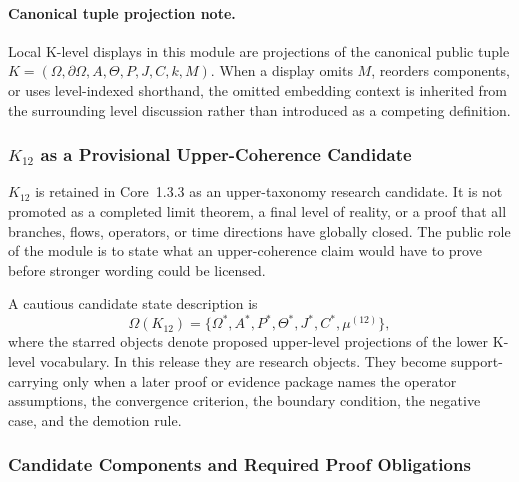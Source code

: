 
\paragraph{Canonical tuple projection note.}
Local K-level displays in this module are projections of the canonical public
tuple \(K=(\Omega,\partial\Omega,A,\Theta,P,J,C,k,M)\). When a display omits
\(M\), reorders components, or uses level-indexed shorthand, the omitted
embedding context is inherited from the surrounding level discussion rather
than introduced as a competing definition.

\subsubsection{\texorpdfstring{$K_{12}$}{K12} as a Provisional Upper-Coherence Candidate}
\label{sec:k12-overview}

\(K_{12}\) is retained in Core~1.3.3 as an upper-taxonomy research candidate.
It is not promoted as a completed limit theorem, a final level of reality, or a
proof that all branches, flows, operators, or time directions have globally
closed. The public role of the module is to state what an upper-coherence claim
would have to prove before stronger wording could be licensed.

A cautious candidate state description is
\[
\Omega(K_{12}) =
\{\Omega^*,A^*,P^*,\Theta^*,J^*,C^*,\mu^{(12)}\},
\]
where the starred objects denote proposed upper-level projections of the lower
K-level vocabulary. In this release they are research objects. They become
support-carrying only when a later proof or evidence package names the
operator assumptions, the convergence criterion, the boundary condition, the
negative case, and the demotion rule.

\subsubsection{Candidate Components and Required Proof Obligations}

